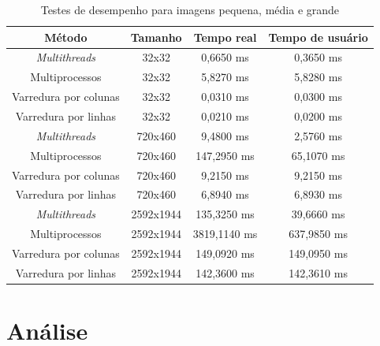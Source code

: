 \documentclass[a4paper, 10pt, conference]{ieeeconf}
\begin{document}
\begin{table}[h]
	\centering
	\caption{Testes de desempenho para imagens pequena, média e grande}
	\label{my-label}
	\begin{tabular}{|c|c|c|c|}
		\hline
		\textbf{Método}       & \textbf{Tamanho} & \textbf{Tempo real} & \textbf{Tempo de usuário} \\ \hline
		\textit{Multithreads}          & 32x32            & 0,6650 ms           & 0,3650 ms                 \\
		Multiprocessos        & 32x32            & 5,8270 ms           & 5,8280 ms                 \\
		Varredura por colunas & 32x32            & 0,0310 ms           & 0,0300 ms                 \\
		Varredura por linhas  & 32x32            & 0,0210 ms           & 0,0200 ms                 \\ \hline
		\textit{Multithreads}          & 720x460          & 9,4800 ms           & 2,5760 ms                 \\
		Multiprocessos        & 720x460          & 147,2950 ms         & 65,1070 ms                \\
		Varredura por colunas & 720x460          & 9,2150 ms           & 9,2150 ms                 \\
		Varredura por linhas  & 720x460          & 6,8940 ms           & 6,8930 ms                 \\ \hline
		\textit{Multithreads}          & 2592x1944          & 135,3250 ms         & 39,6660 ms                \\
		Multiprocessos        & 2592x1944          & 3819,1140 ms        & 637,9850 ms               \\
		Varredura por colunas & 2592x1944          & 149,0920 ms         & 149,0950 ms               \\
		Varredura por linhas  & 2592x1944          & 142,3600 ms         & 142,3610 ms               \\ \hline
		
	\end{tabular}
\end{table}


\section{Análise}

\end{document}
